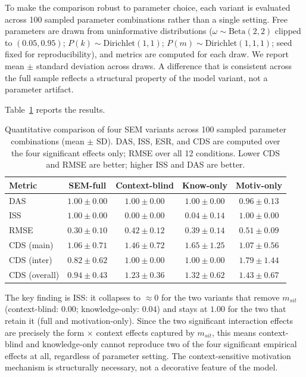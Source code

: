 \documentclass[12pt,a4paper]{article}
\begin{document}
To make the comparison robust to parameter choice, each variant is evaluated
across 100 sampled parameter combinations rather than a single setting. Free
parameters are drawn from uninformative distributions ($\omega \sim
\text{Beta}(2,2)$ clipped to $(0.05, 0.95)$; $P(k) \sim \text{Dirichlet}(1,1)$;
$P(m) \sim \text{Dirichlet}(1,1,1)$; seed fixed for reproducibility), and
metrics are computed for each draw. We report mean $\pm$ standard deviation
across draws. A difference that is consistent across the full sample reflects
a structural property of the model variant, not a parameter artifact.

Table~\ref{tab:variant_comparison} reports the results.

\begin{table}[ht]
\centering
\caption{Quantitative comparison of four SEM variants across 100 sampled
         parameter combinations (mean $\pm$ SD). DAS, ISS, ESR, and CDS are
         computed over the four significant effects only; RMSE over all 12
         conditions. Lower CDS and RMSE are better; higher ISS and DAS are
         better.}
\label{tab:variant_comparison}
\renewcommand{\arraystretch}{1.15}
\begin{tabular}{lcccc}
\toprule
Metric & SEM-full & Context-blind & Know-only & Motiv-only \\
\midrule
DAS            & $1.00 \pm 0.00$ & $1.00 \pm 0.00$ & $1.00 \pm 0.00$ & $0.96 \pm 0.13$ \\
ISS            & $\mathbf{1.00 \pm 0.00}$ & $0.00 \pm 0.00$ & $0.04 \pm 0.14$ & $1.00 \pm 0.00$ \\
RMSE           & $\mathbf{0.30 \pm 0.10}$ & $0.42 \pm 0.12$ & $0.39 \pm 0.14$ & $0.51 \pm 0.09$ \\
CDS (main)     & $\mathbf{1.06 \pm 0.71}$ & $1.46 \pm 0.72$ & $1.65 \pm 1.25$ & $1.07 \pm 0.56$ \\
CDS (inter)    & $\mathbf{0.82 \pm 0.62}$ & $1.00 \pm 0.00$ & $1.00 \pm 0.00$ & $1.79 \pm 1.44$ \\
CDS (overall)  & $\mathbf{0.94 \pm 0.43}$ & $1.23 \pm 0.36$ & $1.32 \pm 0.62$ & $1.43 \pm 0.67$ \\
\bottomrule
\end{tabular}
\end{table}

The key finding is ISS: it collapses to $\approx 0$ for the two variants that
remove $m_{sit}$ (context-blind: $0.00$; knowledge-only: $0.04$) and stays at
$1.00$ for the two that retain it (full and motivation-only). Since the two
significant interaction effects are precisely the form $\times$ context effects
captured by $m_{sit}$, this means context-blind and knowledge-only cannot
reproduce two of the four significant empirical effects at all, regardless of
parameter setting. The context-sensitive motivation mechanism is structurally
necessary, not a decorative feature of the model.
\end{document}
